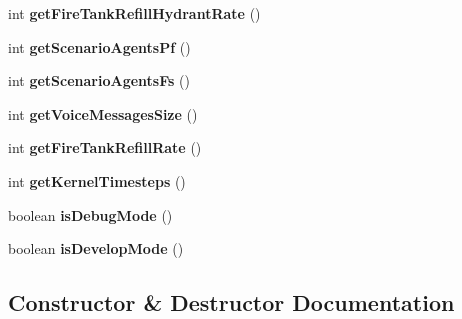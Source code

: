 \begin{DoxyCompactItemize}
int {\bfseries get\+Fire\+Tank\+Refill\+Hydrant\+Rate} ()
\item 
\hypertarget{classadf_1_1agent_1_1info_1_1ScenarioInfo_a5bf2de3e56110069391e8f7a7fee4aa0}{}\label{classadf_1_1agent_1_1info_1_1ScenarioInfo_a5bf2de3e56110069391e8f7a7fee4aa0} 
int {\bfseries get\+Scenario\+Agents\+Pf} ()
\item 
\hypertarget{classadf_1_1agent_1_1info_1_1ScenarioInfo_a857f7a6196944b4ad8f47bde5a162235}{}\label{classadf_1_1agent_1_1info_1_1ScenarioInfo_a857f7a6196944b4ad8f47bde5a162235} 
int {\bfseries get\+Scenario\+Agents\+Fs} ()
\item 
\hypertarget{classadf_1_1agent_1_1info_1_1ScenarioInfo_a2f1db5e455004c370c1a4c1c945b50bd}{}\label{classadf_1_1agent_1_1info_1_1ScenarioInfo_a2f1db5e455004c370c1a4c1c945b50bd} 
int {\bfseries get\+Voice\+Messages\+Size} ()
\item 
\hypertarget{classadf_1_1agent_1_1info_1_1ScenarioInfo_a12cb6450e037f4eb68c5e1026460bcb5}{}\label{classadf_1_1agent_1_1info_1_1ScenarioInfo_a12cb6450e037f4eb68c5e1026460bcb5} 
int {\bfseries get\+Fire\+Tank\+Refill\+Rate} ()
\item 
\hypertarget{classadf_1_1agent_1_1info_1_1ScenarioInfo_a52ab8da13a32eaba0149a63b0afe7c0a}{}\label{classadf_1_1agent_1_1info_1_1ScenarioInfo_a52ab8da13a32eaba0149a63b0afe7c0a} 
int {\bfseries get\+Kernel\+Timesteps} ()
\item 
\hypertarget{classadf_1_1agent_1_1info_1_1ScenarioInfo_a4442f0a3a58c14a7e869d197146100ca}{}\label{classadf_1_1agent_1_1info_1_1ScenarioInfo_a4442f0a3a58c14a7e869d197146100ca} 
boolean {\bfseries is\+Debug\+Mode} ()
\item 
\hypertarget{classadf_1_1agent_1_1info_1_1ScenarioInfo_a85b85ec035ea3cbe7f8440b4f44b53b1}{}\label{classadf_1_1agent_1_1info_1_1ScenarioInfo_a85b85ec035ea3cbe7f8440b4f44b53b1} 
boolean {\bfseries is\+Develop\+Mode} ()
\end{DoxyCompactItemize}


\subsection{Constructor \& Destructor Documentation}
\hypertarget{classadf_1_1agent_1_1info_1_1ScenarioInfo_a3fecc58b0e8396a6935653e872cdb8b6}{}\label{classadf_1_1agent_1_1info_1_1ScenarioInfo_a3fecc58b0e8396a6935653e872cdb8b6} 
